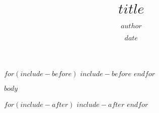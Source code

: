 \documentclass[12pt,twoside,a4paper, a$if(lang)$$babel-lang$,$endif$$if(papersize)$$papersize$paper,$endif$$for(classoption)$$classoption$$sep$,$endfor$]{$documentclass$}
\title{$title$}
\author{$author$}
\date{$date$}
\begin{document}
$for(include-before)$
  $include-before$
$endfor$
% 

$body$



$for(include-after)$
  $include-after$
$endfor$
\end{document}
